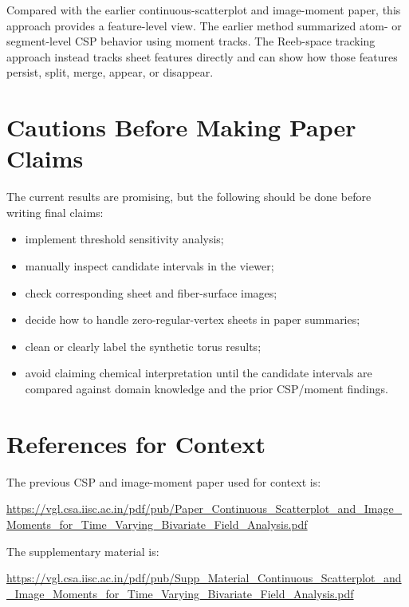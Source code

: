 \documentclass[11pt]{article}
\begin{document}
Compared with the earlier continuous-scatterplot and image-moment paper, this
approach provides a feature-level view. The earlier method summarized atom- or
segment-level CSP behavior using moment tracks. The Reeb-space tracking
approach instead tracks sheet features directly and can show how those features
persist, split, merge, appear, or disappear.

\section{Cautions Before Making Paper Claims}

The current results are promising, but the following should be done before
writing final claims:

\begin{itemize}[leftmargin=*]
\item implement threshold sensitivity analysis;
\item manually inspect candidate intervals in the viewer;
\item check corresponding sheet and fiber-surface images;
\item decide how to handle zero-regular-vertex sheets in paper summaries;
\item clean or clearly label the synthetic torus results;
\item avoid claiming chemical interpretation until the candidate intervals are
  compared against domain knowledge and the prior CSP/moment findings.
\end{itemize}

\section{References for Context}

The previous CSP and image-moment paper used for context is:

\begin{center}
\url{https://vgl.csa.iisc.ac.in/pdf/pub/Paper_Continuous_Scatterplot_and_Image_Moments_for_Time_Varying_Bivariate_Field_Analysis.pdf}
\end{center}

The supplementary material is:

\begin{center}
\url{https://vgl.csa.iisc.ac.in/pdf/pub/Supp_Material_Continuous_Scatterplot_and_Image_Moments_for_Time_Varying_Bivariate_Field_Analysis.pdf}
\end{center}
\end{document}
